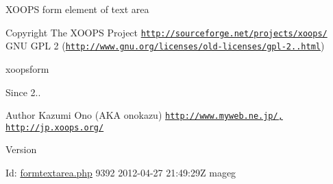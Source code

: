 X\-O\-O\-P\-S form element of text area

\begin{DoxyCopyright}{Copyright}
The X\-O\-O\-P\-S Project \href{http://sourceforge.net/projects/xoops/}{\tt http\-://sourceforge.\-net/projects/xoops/}  G\-N\-U G\-P\-L 2 (\href{http://www.gnu.org/licenses/old-licenses/gpl-2.0.html}{\tt http\-://www.\-gnu.\-org/licenses/old-\/licenses/gpl-\/2..\-html})
\end{DoxyCopyright}
xoopsform \begin{DoxySince}{Since}
2.. 
\end{DoxySince}
\begin{DoxyAuthor}{Author}
Kazumi Ono (A\-K\-A onokazu) \href{http://www.myweb.ne.jp/,}{\tt http\-://www.\-myweb.\-ne.\-jp/,} \href{http://jp.xoops.org/}{\tt http\-://jp.\-xoops.\-org/} 
\end{DoxyAuthor}
\begin{DoxyVersion}{Version}

\end{DoxyVersion}
\begin{DoxyParagraph}{Id\-:}
\hyperlink{formtextarea_8php}{formtextarea.\-php} 9392 2012-\/04-\/27 21\-:49\-:29\-Z mageg 
\end{DoxyParagraph}
